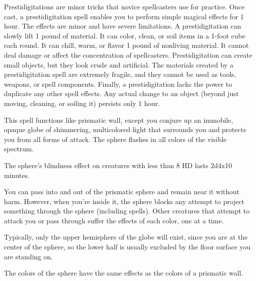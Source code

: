 \begin{multicols}{2}
\begin{small}
\noindent Prestidigitations are minor tricks that novice spellcasters use for practice. Once cast, a prestidigitation spell enables you to perform simple magical effects for 1 hour. The effects are minor and have severe limitations. A prestidigitation can slowly lift 1 pound of material. It can color, clean, or soil items in a 1-foot cube each round. It can chill, warm, or flavor 1 pound of nonliving material. It cannot deal damage or affect the concentration of spellcasters. Prestidigitation can create small objects, but they look crude and artificial. The materials created by a prestidigitation spell are extremely fragile, and they cannot be used as tools, weapons, or spell components. Finally, a prestidigitation lacks the power to duplicate any other spell effects. Any actual change to an object (beyond just moving, cleaning, or soiling it) persists only 1 hour.

\noindent This spell functions like prismatic wall, except you conjure up an immobile, opaque globe of shimmering, multicolored light that surrounds you and protects you from all forms of attack. The sphere flashes in all colors of the visible spectrum. 

\smallskip\noindent The sphere's blindness effect on creatures with less than 8 HD lasts 2d4x10 minutes.

\smallskip\noindent You can pass into and out of the prismatic sphere and remain near it without harm. However, when you're inside it, the sphere blocks any attempt to project something through the sphere (including spells). Other creatures that attempt to attack you or pass through suffer the effects of each color, one at a time.

\smallskip\noindent Typically, only the upper hemisphere of the globe will exist, since you are at the center of the sphere, so the lower half is usually excluded by the floor surface you are standing on.

\smallskip\noindent The colors of the sphere have the same effects as the colors of a prismatic wall.


\end{small}
\end{multicols}
